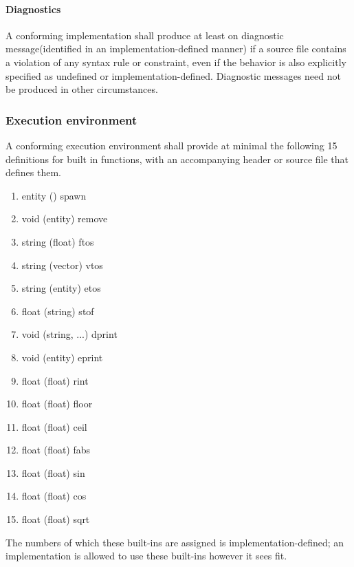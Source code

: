\documentclass{article}
\begin{document}
\paragraph*{Diagnostics}
A conforming implementation shall produce at least on diagnostic message(identified in an
implementation-defined manner) if a source file contains a violation of any syntax rule or
constraint, even if the behavior is also explicitly specified as undefined or
implementation-defined. Diagnostic messages need not be produced in other circumstances.

\subsubsection{Execution environment}
A conforming execution environment shall provide at minimal the following 15 definitions
for built in functions, with an accompanying header or source file that defines them.
\begin{enumerate}
	\item entity ()                                spawn
	\item void   (entity)                          remove
	
	\item string (float)                           ftos
	\item string (vector)                          vtos
	\item string (entity)                          etos
	\item float  (string)                          stof
	
	\item void   (string, ...)                     dprint
	\item void   (entity)                          eprint
	
	\item float  (float)                           rint
	\item float  (float)                           floor
	\item float  (float)                           ceil
	\item float  (float)                           fabs
	\item float  (float)                           sin
	\item float  (float)                           cos
	\item float  (float)                           sqrt
\end{enumerate}
The numbers of which these built-ins are assigned is implementation-defined;
an implementation is allowed to use these built-ins however it sees fit.
\end{document}
